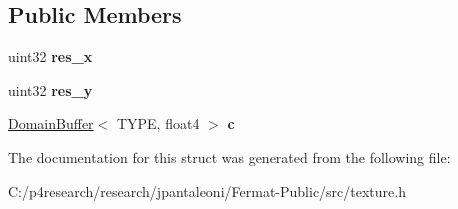 \subsection*{Public Members}
\begin{DoxyCompactItemize}
\item 
\mbox{\label{struct_texture_storage_a8cd76115a40782ded13720e00368ee99}} 
uint32 {\bfseries res\+\_\+x}
\item 
\mbox{\label{struct_texture_storage_afa092f534a9dde4bab53b183baeb11f0}} 
uint32 {\bfseries res\+\_\+y}
\item 
\mbox{\label{struct_texture_storage_a336af86f10f3d295a2f450708f1a3a45}} 
\hyperlink{class_domain_buffer}{Domain\+Buffer}$<$ T\+Y\+PE, float4 $>$ {\bfseries c}
\end{DoxyCompactItemize}


The documentation for this struct was generated from the following file\+:\begin{DoxyCompactItemize}
\item 
C\+:/p4research/research/jpantaleoni/\+Fermat-\/\+Public/src/texture.\+h\end{DoxyCompactItemize}
